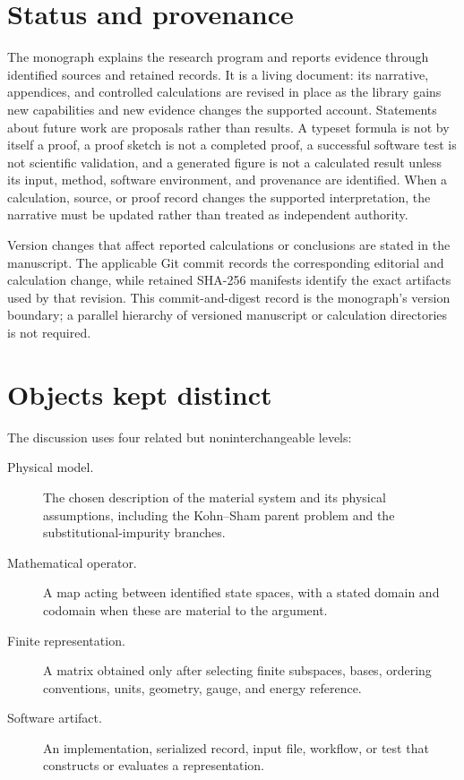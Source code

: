 \section*{Status and provenance}

The monograph explains the research program and reports evidence through
identified sources and retained records. It is a living document: its narrative,
appendices, and controlled calculations are revised in place as the library gains
new capabilities and new evidence changes the supported account. Statements about
future work are proposals rather than results. A typeset formula is not by itself
a proof, a proof sketch is not a completed proof, a successful software test is
not scientific validation, and a generated figure is not a calculated result
unless its input, method, software environment, and provenance are identified.
When a calculation, source, or proof record changes the supported interpretation,
the narrative must be updated rather than treated as independent authority.

Version changes that affect reported calculations or conclusions are stated in
the manuscript. The applicable Git commit records the corresponding editorial
and calculation change, while retained SHA-256 manifests identify the exact
artifacts used by that revision. This commit-and-digest record is the monograph's
version boundary; a parallel hierarchy of versioned manuscript or calculation
directories is not required.

\section*{Objects kept distinct}

The discussion uses four related but noninterchangeable levels:

\begin{description}
  \item[Physical model.] The chosen description of the material system and its
    physical assumptions, including the Kohn--Sham parent problem and the
    substitutional-impurity branches.
  \item[Mathematical operator.] A map acting between identified state spaces,
    with a stated domain and codomain when these are material to the argument.
  \item[Finite representation.] A matrix obtained only after selecting finite
    subspaces, bases, ordering conventions, units, geometry, gauge, and energy
    reference.
  \item[Software artifact.] An implementation, serialized record, input file,
    workflow, or test that constructs or evaluates a representation.
\end{description}

